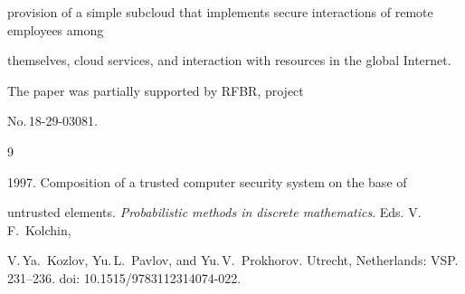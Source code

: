 {{provision of a simple subcloud that implements secure interactions of remote employees among 


themselves, cloud services, and interaction with resources in the global Internet.}





















\vspace*{-12pt}








\Ack


\noindent


The paper was partially supported by RFBR, project  


No.\,18-29-03081.


 










\renewcommand{\bibname}{\protect\rmfamily References}







{\small\frenchspacing


{%




\begin{thebibliography}{9}




 1997. Composition of a trusted computer security system on the base of 


untrusted elements. \textit{Probabilistic methods in discrete mathematics}. Eds. V.\,F.~Kolchin, 


V.\,Ya.~Kozlov, Yu.\,L.~Pavlov, and Yu.\,V.~Prokhorov. Utrecht, Netherlands: VSP. 231--236.  doi: 10.1515/9783112314074-022.



\end{thebibliography}}}}
